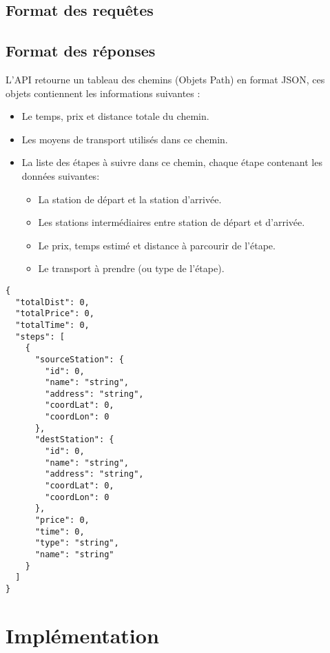 	\subsection{Format des requêtes}
	
	\subsection{Format des réponses}
	L'API retourne un tableau des chemins (Objets Path) en format JSON, ces objets contiennent les informations suivantes :
	\begin{itemize}
	\item Le temps, prix et distance totale du chemin.
	\item Les moyens de transport utilisés dans ce chemin.
	\item La liste des étapes à suivre dans ce chemin, chaque étape contenant les données suivantes:
	\begin{itemize}
		\item La station de départ et la station d'arrivée.
		\item Les stations intermédiaires entre station de départ et d'arrivée.
		\item Le prix, temps estimé et distance à parcourir de l'étape.
		\item Le transport à prendre (ou type de l'étape).
	\end{itemize}
	\end{itemize}
\begin{lstlisting}[caption=Format JSON de Path (chemin)]
{
  "totalDist": 0,
  "totalPrice": 0,
  "totalTime": 0,
  "steps": [
    {
      "sourceStation": {
        "id": 0,
        "name": "string",
        "address": "string",
        "coordLat": 0,
        "coordLon": 0
      },
      "destStation": {
        "id": 0,
        "name": "string",
        "address": "string",
        "coordLat": 0,
        "coordLon": 0
      },
      "price": 0,
      "time": 0,
      "type": "string",
      "name": "string"
    }
  ]
}
\end{lstlisting}
\section{Implémentation}